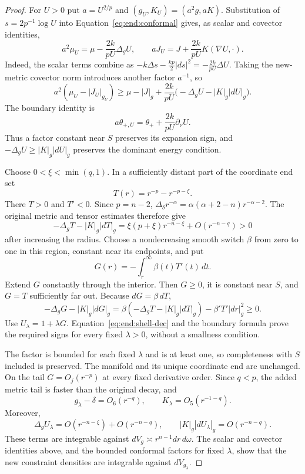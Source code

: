 \begin{proof}
For $U>0$ put $a=U^{2/p}$ and $(g_U,K_U)=(a^2g,aK)$.
Substitution of $s=2p^{-1}\log U$ into
Equation~\eqref{eq:end:conformal} gives, as scalar and covector identities,
\[
 a^2\mu_U=\mu-\frac{2k}{pU}\Delta_gU,\qquad
 aJ_U=J+\frac{2k}{pU}K(\nabla U,\cdot).
\]
Indeed, the scalar terms combine as
$-k\Delta s-\frac{kp}{2}|ds|^2=-\frac{2k}{pU}\Delta U$.
Taking the new-metric covector norm introduces another factor $a^{-1}$,
so
\begin{equation}\label{eq:end:shell-dec}
 a^2(\mu_U-|J_U|_{g_U})
 \ge \mu-|J|_g+\frac{2k}{pU}
       \bigl(-\Delta_gU-|K|_g|dU|_g\bigr).
\end{equation}
The boundary identity is
\[
 a\theta_{+,U}=\theta_++\frac{2k}{pU}\partial_\nu U.
\]
Thus a factor constant near $S$ preserves its expansion sign, and
$-\Delta_gU\ge |K|_g|dU|_g$ preserves the dominant energy condition.

Choose $0<\xi<\min(q,1)$. In a sufficiently distant part of the
coordinate end set
\[
 T(r)=r^{-p}-r^{-p-\xi}.
\]
There $T>0$ and $T'<0$. Since $p=n-2$,
$\Delta_\delta r^{-\alpha}=\alpha(\alpha+2-n)r^{-\alpha-2}$.
The original metric and tensor estimates therefore give
\[
 -\Delta_gT-|K|_g|dT|_g
 =\xi(p+\xi)r^{-n-\xi}+O(r^{-n-q})>0
\]
after increasing the radius. Choose a nondecreasing smooth switch
$\beta$ from zero to one in this region, constant near its endpoints,
and put
\[
 G(r)=-\int_r^\infty\beta(t)T'(t)\,dt.
\]
Extend $G$ constantly through the interior. Then $G\ge0$, it is constant
near $S$, and $G=T$ sufficiently far out. Because $dG=\beta\,dT$,
\[
 -\Delta_gG-|K|_g|dG|_g
 =\beta(-\Delta_gT-|K|_g|dT|_g)-\beta'T'|dr|_g^2\ge0.
\]
Use $U_\lambda=1+\lambda G$. Equation~\eqref{eq:end:shell-dec} and
the boundary formula prove the required signs for every fixed
$\lambda>0$, without a smallness condition.

The factor is bounded for each fixed $\lambda$ and is at least one,
so completeness with $S$ included is preserved. The manifold and
its unique coordinate end are unchanged. On the tail $G=O_j(r^{-p})$
at every fixed derivative order. Since $q<p$, the added metric tail
is faster than the original decay, and
\[
 g_\lambda-\delta=O_6(r^{-q}),\qquad
 K_\lambda=O_5(r^{-1-q}).
\]
Moreover,
\[
 \Delta_gU_\lambda=O(r^{-n-\xi})+O(r^{-n-q}),\qquad
 |K|_g|dU_\lambda|_g=O(r^{-n-q}).
\]
These terms are integrable against $dV_g\asymp r^{n-1}dr\,d\omega$.
The scalar and covector identities above, and the bounded conformal
factors for fixed $\lambda$, show that the new constraint densities
are integrable against $dV_{g_\lambda}$.


\end{proof}
